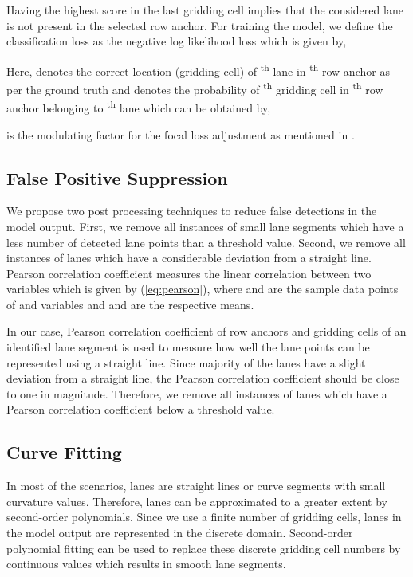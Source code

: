 \documentclass[conference]{IEEEtran}
\begin{document}
Having the highest score in the last gridding cell implies that the considered lane is not present in the selected row anchor. For training the model, we define the classification loss as the negative log likelihood loss which is given by, 

Here,  denotes the correct location (gridding cell) of \textsuperscript{th} lane in \textsuperscript{th} row anchor as per the ground truth and  denotes the probability of \textsuperscript{th} gridding cell in \textsuperscript{th} row anchor belonging to \textsuperscript{th} lane which can be obtained by,

  is the modulating factor for the focal loss adjustment as mentioned in \cite{lin2017focal}.  


\subsection{False Positive Suppression}
\label{ssec:FPSup}

We propose two post processing techniques to reduce false detections in the model output. First, we remove all instances of small lane segments which have a less number of detected lane points than a threshold value. Second, we remove all instances of lanes which have a considerable deviation from a straight line. Pearson correlation coefficient measures the linear correlation between two variables which is given by (\ref{eq:pearson}), where  and  are the sample data points of  and  variables and  and  are the respective means. 


In our case, Pearson correlation coefficient of row anchors and gridding cells of an identified lane segment is used to measure how well the lane points can be represented using a straight line. Since majority of the lanes have a slight deviation from a straight line, the Pearson correlation coefficient should be close to one in magnitude. Therefore, we remove all instances of lanes which have a Pearson correlation coefficient below a threshold value.

\subsection{Curve Fitting}
\label{ssec:LSQLF}
In most of the scenarios, lanes are straight lines or curve segments with small curvature values. Therefore, lanes can be approximated to a greater extent by second-order polynomials. Since we use a finite number of gridding cells, lanes in the model output are represented in the discrete domain. Second-order polynomial fitting can be used to replace these discrete gridding cell numbers by continuous values which results in smooth lane segments.
\end{document}

